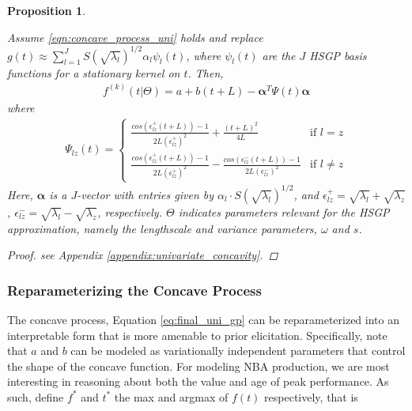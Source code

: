 \documentclass[aoas]{imsart}
\newtheorem{proposition}{Proposition}
\begin{document}
\begin{proposition}\label{prop:concave_uni_gp}

Assume \eqref{eqn:concave_process_uni} holds and replace $g(t) \approx \sum_{l=1}^J S(\sqrt{\lambda_l})^{1/2} \alpha_l \psi_l(t)$, where $\psi_l(t)$ are the $J$ HSGP basis functions for a stationary kernel on $t$. Then, 
\begin{align}
\label{eq:final_uni_gp}
    f^{(k)}(t | \Theta) = a + b(t+L) - \mathbf{\alpha}^T \Psi(t) \mathbf{\alpha}
\end{align} 
%
where 
\begin{align}
\label{eq:phi}
\Psi_{lz}(t) = 
\begin{cases} \frac{cos(\epsilon_{lz}^{+}(t+L)) - 1}{2L(\epsilon_{lz}^{+})^2} +
\frac{(t+L)^2}{4L}  & \text{if } l = z \\
\frac{cos(\epsilon_{lz}^{+}(t+L)) - 1}{2L(\epsilon_{lz}^{+})^2} - \frac{cos(\epsilon_{lz}^{-}(t+L)) - 1}{2L(\epsilon_{lz}^{-})^2} & \text{if } l \neq z
\end{cases}
\end{align}
Here, $\mathbf{\alpha}$ is a $J$-vector with entries given by $\alpha_l \cdot S(\sqrt{\lambda_l})^{1/2}$, and $\epsilon_{lz}^{+} = \sqrt{\lambda_l} + \sqrt{\lambda_z}$, $\epsilon_{lz}^{-} = \sqrt{\lambda_l} - \sqrt{\lambda_z}$, respectively. $\Theta$ indicates parameters relevant for the HSGP approximation, namely the lengthscale and variance parameters, $\omega$ and $s$. 

\begin{proof}
    see Appendix \ref{appendix:univariate_concavity}.
\end{proof}

\end{proposition}






\subsubsection{Reparameterizing the Concave Process}
The concave process, Equation \eqref{eq:final_uni_gp} can be reparameterized into an interpretable form that is more amenable to prior elicitation.  Specifically, note that $a$ and $b$ can be modeled as variationally independent parameters that control the shape of the concave function. For modeling NBA production, we are most interesting in reasoning about both the value and age of peak performance. As such, define $f^*$ and $t^*$ the max and argmax of $f(t)$ respectively, that is
\end{document}
